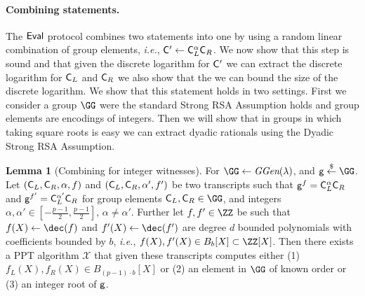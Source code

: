 \documentclass{article}
\theoremstyle{definition}
\newtheorem{lemma}{Lemma}
\begin{document}
\paragraph{Combining statements.} The $\textsf{{Eval}}$ protocol combines two statements into one by using a random linear combination of group elements, \emph{i.e.}, $\mathsf{C}'\gets \mathsf{C}_L^{\alpha}\mathsf{C}_R$. We now show that this step is sound and that given the discrete logarithm for $\mathsf{C}'$ we can extract the discrete logarithm for $\mathsf{C}_L$ and $\mathsf{C}_R$ we also show that the we can bound the size of the discrete logarithm. We show that this statement holds in two settings. First we consider a group $\GG$ were the standard Strong RSA Assumption holds and group elements are encodings of integers. 
Then we will show that in groups in which taking square roots is easy we can extract dyadic rationals using the Dyadic Strong RSA Assumption.
\begin{lemma}[Combining for integer witnesses]
\label{lem:intrandomcombine}
	For $\GG \gets \ggen(\lambda)$, and $\gr{g}\sample \GG$. 
	Let $(\mathsf{C}_L,\mathsf{C}_R,\alpha,f)$ and  $(\mathsf{C}_L,\mathsf{C}_R,\alpha',f')$ be two transcripts such that $\mathsf{g}^{f}=\mathsf{C}_L^{\alpha}\mathsf{C}_R$ and $\mathsf{g}^{f'}=\mathsf{C}_L^{\alpha'}\mathsf{C}_R$ for group elements $\gr{C}_L,\gr{C}_R \in \GG$, and integers $\alpha,\alpha' \in  [-\frac{p-1}{2},\frac{p-1}{2}]$, $\alpha\neq \alpha'$. Further let $f,f'\in \ZZ$ be such that $f(X)\gets\dec(f)$ and $f'(X)\gets\dec(f')$ are degree $d$ bounded polynomials with coefficients bounded by $b$, \emph{i.e.}, $f(X),f'(X)\in B_{b}[X]\subset \ZZ[X]$.
	 Then there exists a PPT algorithm $\mathcal{X}$ that given these transcripts computes either (1) $f_L(X),f_R(X)\in B_{(p-1) \cdot b}[X]$ or (2) an element in $\GG$ of known order or (3) an integer root of $\mathsf{g}$.
\end{lemma}
\end{document}
